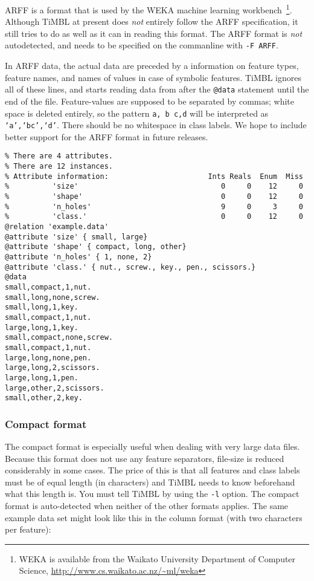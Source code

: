 \documentclass{report}
\begin{document}
ARFF is a format that is used by the WEKA machine learning
workbench~\cite{Garner95,Witten+99}\footnote{WEKA is available from
the Waikato University Department of Computer Science, \url{http://www.cs.waikato.ac.nz/~ml/weka}}.  Although TiMBL at present
does {\em not}\/ entirely follow the ARFF specification, it still
tries to do as well as it can in reading this format. The ARFF format
is {\em not}\/ autodetected, and needs to be specified on the
commanline with {\tt -F ARFF}.


In ARFF data, the actual data are preceded by a information on feature
types, feature names, and names of values in case of symbolic
features. TiMBL ignores all of these lines, and starts reading data
from after the {\tt @data} statement until the end of the
file. Feature-values are supposed to be separated by commas; white
space is deleted entirely, so the pattern {\tt a, b c,d} will be
interpreted as {\tt `a',`bc',`d'}. There should be no whitespace in
class labels.  We hope to include better support for the ARFF format
in future releases.

\begin{footnotesize}
\begin{verbatim}
% There are 4 attributes.
% There are 12 instances.
% Attribute information:                       Ints Reals  Enum  Miss
%          'size'                                 0     0    12     0   
%          'shape'                                0     0    12     0   
%          'n_holes'                              9     0     3     0   
%          'class.'                               0     0    12     0   
@relation 'example.data'
@attribute 'size' { small, large}
@attribute 'shape' { compact, long, other}
@attribute 'n_holes' { 1, none, 2}
@attribute 'class.' { nut., screw., key., pen., scissors.}
@data
small,compact,1,nut.
small,long,none,screw.
small,long,1,key.
small,compact,1,nut.
large,long,1,key.
small,compact,none,screw.
small,compact,1,nut.
large,long,none,pen.
large,long,2,scissors.
large,long,1,pen.
large,other,2,scissors.
small,other,2,key.
\end{verbatim}
\end{footnotesize}

\subsubsection{Compact format}
\label{compactformat}

The compact format is especially useful when dealing with very large
data files. Because this format does not use any feature separators,
file-size is reduced considerably in some cases. The price of this is
that all features and class labels must be of equal length (in
characters) and TiMBL needs to know beforehand what this length
is. You must tell TiMBL by using the {\tt -l} option. The compact
format is auto-detected when neither of the other formats applies. The
same example data set might look like this in the column format (with
two characters per feature):
\end{document}
